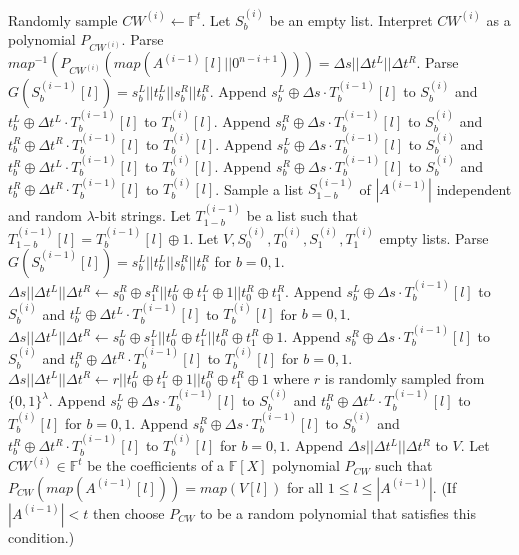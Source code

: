 \begin{algorithm}[H]
\begin{algorithmic}[1]
		\State Randomly sample $CW^{(i)}\leftarrow \mathbb{F}^t$.
		\State Let $S_b^{(i)}$ be an empty list. 
		\State Interpret $CW^{(i)}$ as a polynomial $P_{CW^{(i)}}$.
		\State Parse $map^{-1}(P_{CW^{(i)}}(map(A^{(i-1)}[l]||0^{n-i+1}))) = \Delta s||\Delta t^L||\Delta t^R$. 
		\State Parse $G(S_b^{(i-1)}[l]) = s_b^L||t_b^L||s_b^R||t_b^R$.
		\State Append $s_b^L\oplus \Delta s\cdot T_b^{(i-1)}[l]$ to $S_b^{(i)}$ and $t_b^L\oplus \Delta t^L\cdot T_b^{(i-1)}[l]$ to $T_b^{(i)}[l]$.
		\State Append $s_b^R\oplus \Delta s\cdot T_b^{(i-1)}[l]$ to $S_b^{(i)}$ and $t_b^R\oplus \Delta t^R\cdot T_b^{(i-1)}[l]$ to $T_b^{(i)}[l]$.
		\Else
		\State Append $s_b^L\oplus \Delta s\cdot T_b^{(i-1)}[l]$ to $S_b^{(i)}$ and $t_b^R\oplus \Delta t^L\cdot T_b^{(i-1)}[l]$ to $T_b^{(i)}[l]$.
		\State Append $s_b^R\oplus \Delta s\cdot T_b^{(i-1)}[l]$ to $S_b^{(i)}$ and $t_b^R\oplus \Delta t^R\cdot T_b^{(i-1)}[l]$ to $T_b^{(i)}[l]$.
		\EndIf
		\EndFor
		\Else
		\State Sample a list $S_{1-b}^{(i-1)}$ of $|A^{(i-1)}|$ independent and random $\lambda$-bit strings.
		\State Let $T_{1-b}^{(i-1)}$ be a list such that $T_{1-b}^{(i-1)}[l] = T_{b}^{(i-1)}[l]\oplus 1$. 
		\EndIf
		\State Let $V,S_0^{(i)},T_0^{(i)}, S_1^{(i)}, T_1^{(i)}$ empty lists. 
		\State Parse $G(S_b^{(i-1)}[l]) = s_b^L||t_b^L||s_b^R||t_b^R$ for $b = 0,1$. 
		\State $\Delta s||\Delta t^L||\Delta t^R\gets s_0^R\oplus s_1^R||t_0^L\oplus t_1^L\oplus 1||t_0^R\oplus t_1^R$. 
		\State Append $s_b^L\oplus \Delta s\cdot T_b^{(i-1)}[l]$ to $S_b^{(i)}$ and $t_b^L\oplus \Delta t^L\cdot T_b^{(i-1)}[l]$ to $T_b^{(i)}[l]$ for $b = 0,1$. 
		\State $\Delta s||\Delta t^L||\Delta t^R\gets s_0^L\oplus s_1^L||t_0^L\oplus t_1^L||t_0^R\oplus t_1^R\oplus 1$. 
		\State Append $s_b^R\oplus \Delta s\cdot T_b^{(i-1)}[l]$ to $S_b^{(i)}$ and $t_b^R\oplus \Delta t^R\cdot T_b^{(i-1)}[l]$ to $T_b^{(i)}[l]$ for $b = 0,1$. 
		\Else
		\State $\Delta s||\Delta t^L||\Delta t^R\gets r||t_0^L\oplus t_1^L\oplus 1||t_0^R\oplus t_1^R\oplus 1$ where $r$ is randomly sampled from $\{0,1\}^\lambda$.
		\State Append $s_b^L\oplus \Delta s\cdot T_b^{(i-1)}[l]$ to $S_b^{(i)}$ and $t_b^R\oplus \Delta t^L\cdot T_b^{(i-1)}[l]$ to $T_b^{(i)}[l]$ for $b = 0,1$. 
		\State Append $s_b^R\oplus \Delta s\cdot T_b^{(i-1)}[l]$ to $S_b^{(i)}$ and $t_b^R\oplus \Delta t^R\cdot T_b^{(i-1)}[l]$ to $T_b^{(i)}[l]$ for $b = 0,1$. 
		\EndIf
		\State Append $\Delta s||\Delta t^L||\Delta t^R$ to $V$. 
		\EndFor
		\State Let $CW^{(i)}\in \mathbb{F}^t$ be the coefficients of a $\mathbb{F}[X]$ polynomial $P_{CW}$ such that $P_{CW}(map(A^{(i-1)}[l])) = map(V[l])$ for all $1\le l\le |A^{(i-1)}|$. (If $|A^{(i-1)}|<t$ then choose $P_{CW}$ to be a random polynomial that satisfies this condition.)
		\EndIf
		

\end{algorithmic}
\end{algorithm}
